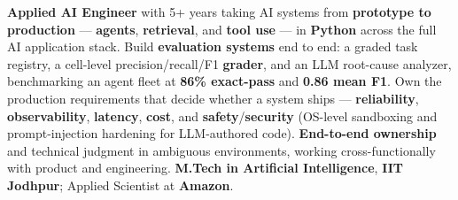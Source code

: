 \documentclass[letter,10pt]{article}
\begin{document}

\textbf{Applied AI Engineer} with 5+ years taking AI systems from \textbf{prototype to production} --- \textbf{agents}, \textbf{retrieval}, and \textbf{tool use} --- in \textbf{Python} across the full AI application stack.
Build \textbf{evaluation systems} end to end: a graded task registry, a cell-level precision/recall/F1 \textbf{grader}, and an LLM root-cause analyzer, benchmarking an agent fleet at \textbf{86\% exact-pass} and \textbf{0.86 mean F1}.
Own the production requirements that decide whether a system ships --- \textbf{reliability}, \textbf{observability}, \textbf{latency}, \textbf{cost}, and \textbf{safety}/\textbf{security} (OS-level sandboxing and prompt-injection hardening for LLM-authored code).
\textbf{End-to-end ownership} and technical judgment in ambiguous environments, working cross-functionally with product and engineering. \textbf{M.Tech in Artificial Intelligence}, \textbf{IIT Jodhpur}; Applied Scientist at \textbf{Amazon}.
\end{document}
